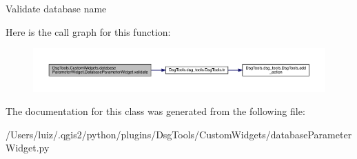 \begin{DoxyVerb}Validate database name
\end{DoxyVerb}
 Here is the call graph for this function\+:
\nopagebreak
\begin{figure}[H]
\begin{center}
\leavevmode
\includegraphics[width=350pt]{class_dsg_tools_1_1_custom_widgets_1_1database_parameter_widget_1_1_database_parameter_widget_aac8d6148a95054fe708592324974eb93_cgraph}
\end{center}
\end{figure}


The documentation for this class was generated from the following file\+:\begin{DoxyCompactItemize}
\item 
/\+Users/luiz/.\+qgis2/python/plugins/\+Dsg\+Tools/\+Custom\+Widgets/database\+Parameter\+Widget.\+py\end{DoxyCompactItemize}
